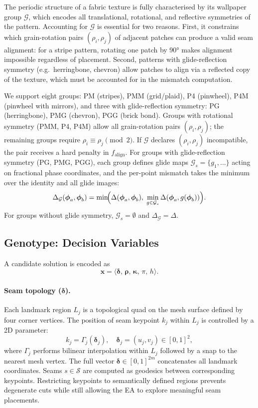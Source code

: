 The periodic structure of a fabric texture is fully characterised by its
wallpaper group $\mathcal{G}$, which encodes all translational, rotational,
and reflective symmetries of the pattern.
Accounting for $\mathcal{G}$ is essential for two reasons.
First, it constrains which grain-rotation pairs $(\rho_i, \rho_j)$ of adjacent
patches can produce a valid seam alignment: for a stripe pattern, rotating one
patch by 90° makes alignment impossible regardless of placement.
Second, patterns with glide-reflection symmetry (e.g.\ herringbone, chevron)
allow patches to align via a reflected copy of the texture, which must be
accounted for in the mismatch computation.

We support eight groups:
PM (stripes), PMM (grid/plaid), P4 (pinwheel), P4M (pinwheel with mirrors),
and three with glide-reflection symmetry: PG (herringbone), PMG (chevron),
PGG (brick bond).
Groups with rotational symmetry (PMM, P4, P4M) allow all grain-rotation
pairs $(\rho_i, \rho_j)$; the remaining groups require
$\rho_i \equiv \rho_j \pmod{2}$.
If $\mathcal{G}$ declares $(\rho_i, \rho_j)$ incompatible, the pair receives
a hard penalty in $f_\text{align}$.
For groups with glide-reflection symmetry (PG, PMG, PGG), each group defines
glide maps $\mathcal{G}_s = \{g_1, \dots\}$ acting on fractional phase
coordinates, and the per-point mismatch takes the minimum over the identity
and all glide images:
\[
\Delta_{\mathcal{G}}(\boldsymbol{\phi}_a, \boldsymbol{\phi}_b)
= \min\!\Bigl(
    \Delta(\boldsymbol{\phi}_a, \boldsymbol{\phi}_b),\;
    \min_{g \in \mathcal{G}_s} \Delta(\boldsymbol{\phi}_a, g(\boldsymbol{\phi}_b))
  \Bigr).
\]
For groups without glide symmetry, $\mathcal{G}_s = \emptyset$ and
$\Delta_{\mathcal{G}} = \Delta$.

\subsection{Genotype: Decision Variables}
\label{sec:genotype}

A candidate solution is encoded as
\[
\mathbf{x} =
\langle
\boldsymbol{\delta},\,
\boldsymbol{\rho},\,
\boldsymbol{\kappa},\,
\pi,\,
h
\rangle.
\]

\paragraph{Seam topology ($\boldsymbol{\delta}$).}
Each landmark region $L_j$ is a topological quad on the mesh surface defined
by four corner vertices.
The position of seam keypoint $k_j$ within $L_j$ is controlled by a 2D
parameter:
\[
k_j = \Gamma_j(\boldsymbol{\delta}_j), \quad
\boldsymbol{\delta}_j = (u_j, v_j) \in [0,1]^2,
\]
where $\Gamma_j$ performs bilinear interpolation within $L_j$ followed by a
snap to the nearest mesh vertex.
The full vector $\boldsymbol{\delta} \in [0,1]^{2m}$ concatenates all
landmark coordinates.
Seams $s \in \mathcal{S}$ are computed as geodesics between corresponding
keypoints.
Restricting keypoints to semantically defined regions prevents degenerate cuts
while still allowing the EA to explore meaningful seam placements.


